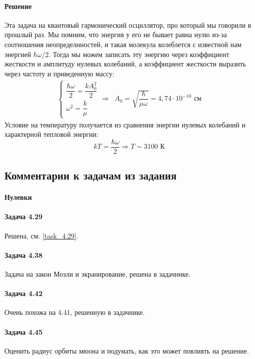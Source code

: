\documentclass[12pt]{article}
\begin{document}
\paragraph{Решение}
Эта задача на квантовый гармонический осциллятор, про который мы говорили в прошлый раз. Мы помним, что энергия у его не бывает равна нулю из-за соотношения неопределнностей, и такая молекула колеблется с известной нам энергией $\hbar \omega/2$. Тогда мы можем записать эту энергию через коэффициент жесткости и амплитуду нулевых колебаний, а коэффициент жесткости выразить через частоту и приведенную массу:
\begin{gather*}
    \begin{cases}
       \dfrac{\hbar \omega}{2} = \dfrac{kA_0^2}{2}\\
       \omega^2 = \dfrac{k}{\mu}
    \end{cases} \Rightarrow \;\; A_0 = \sqrt{\dfrac{\hbar}{\mu \omega}} = 4,74\cdot 10^{-10} \text{ см}
\end{gather*}
Условие на температуру получается из сравнения энергии нулевых колебаний и характерной тепловой энергии:
\begin{equation*}
    kT = \dfrac{\hbar \omega}{2} \Rightarrow T\sim 3100 \text{ К}
\end{equation*}


\subsection{Комментарии к задачам из задания}
\paragraph{Нулевки} 
\paragraph{Задача 4.29} Решена, см. \ref{task_4.29}.
\paragraph{Задача 4.38} Задача на закон Мозли и экранирование, решена в задачнике.
\paragraph{Задача 4.42} Очень похожа на 4.41, решенную в задачнике.
\paragraph{Задача 4.45} Оценить радиус орбиты мюона и подумать, как это может повлиять на решение. 
\end{document}
